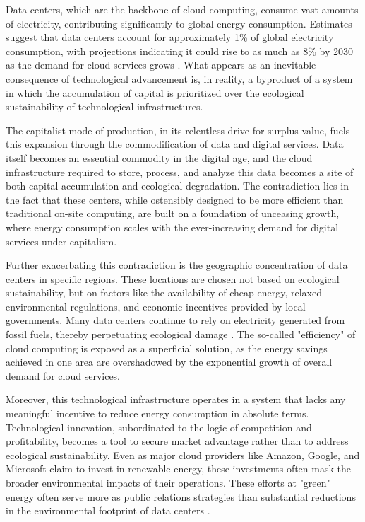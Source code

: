 \begin{refsection}
Data centers, which are the backbone of cloud computing, consume vast amounts of electricity, contributing significantly to global energy consumption. Estimates suggest that data centers account for approximately 1\% of global electricity consumption, with projections indicating it could rise to as much as 8\% by 2030 as the demand for cloud services grows \cite[pp.~163-165]{jones2018}. What appears as an inevitable consequence of technological advancement is, in reality, a byproduct of a system in which the accumulation of capital is prioritized over the ecological sustainability of technological infrastructures.

The capitalist mode of production, in its relentless drive for surplus value, fuels this expansion through the commodification of data and digital services. Data itself becomes an essential commodity in the digital age, and the cloud infrastructure required to store, process, and analyze this data becomes a site of both capital accumulation and ecological degradation. The contradiction lies in the fact that these centers, while ostensibly designed to be more efficient than traditional on-site computing, are built on a foundation of unceasing growth, where energy consumption scales with the ever-increasing demand for digital services under capitalism.

Further exacerbating this contradiction is the geographic concentration of data centers in specific regions. These locations are chosen not based on ecological sustainability, but on factors like the availability of cheap energy, relaxed environmental regulations, and economic incentives provided by local governments. Many data centers continue to rely on electricity generated from fossil fuels, thereby perpetuating ecological damage \cite[pp.~156-158]{coroama2013}. The so-called "efficiency" of cloud computing is exposed as a superficial solution, as the energy savings achieved in one area are overshadowed by the exponential growth of overall demand for cloud services.

Moreover, this technological infrastructure operates in a system that lacks any meaningful incentive to reduce energy consumption in absolute terms. Technological innovation, subordinated to the logic of competition and profitability, becomes a tool to secure market advantage rather than to address ecological sustainability. Even as major cloud providers like Amazon, Google, and Microsoft claim to invest in renewable energy, these investments often mask the broader environmental impacts of their operations. These efforts at "green" energy often serve more as public relations strategies than substantial reductions in the environmental footprint of data centers \cite[pp.~280-282]{smil2018}.


\end{refsection}
